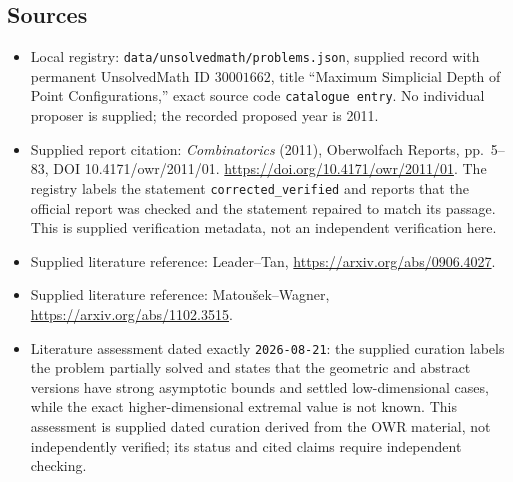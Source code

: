 \documentclass[11pt]{article}
\begin{document}
\subsection{Sources}
\begin{itemize}
\item Local registry: \texttt{data/unsolvedmath/problems.json}, supplied record with permanent UnsolvedMath ID \(30001662\), title ``Maximum Simplicial Depth of Point Configurations,'' exact source code \texttt{catalogue entry}. No individual proposer is supplied; the recorded proposed year is 2011.
\item Supplied report citation: \emph{Combinatorics} (2011), Oberwolfach Reports, pp.~5--83, DOI 10.4171/owr/2011/01. \url{https://doi.org/10.4171/owr/2011/01}. The registry labels the statement \texttt{corrected\_verified} and reports that the official report was checked and the statement repaired to match its passage. This is supplied verification metadata, not an independent verification here.
\item Supplied literature reference: Leader--Tan, \url{https://arxiv.org/abs/0906.4027}.
\item Supplied literature reference: Matoušek--Wagner, \url{https://arxiv.org/abs/1102.3515}.
\item Literature assessment dated exactly \texttt{2026-08-21}: the supplied curation labels the problem partially solved and states that the geometric and abstract versions have strong asymptotic bounds and settled low-dimensional cases, while the exact higher-dimensional extremal value is not known. This assessment is supplied dated curation derived from the OWR material, not independently verified; its status and cited claims require independent checking.
\end{itemize}
\end{document}
